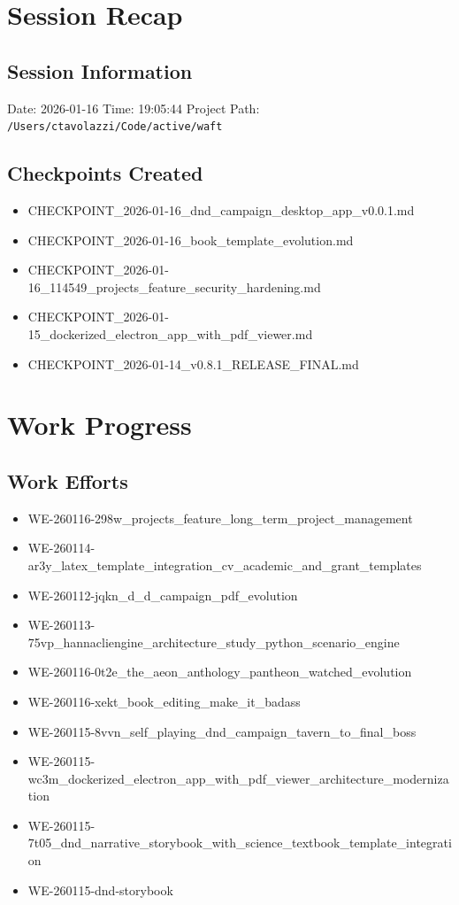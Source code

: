 \documentclass{book}
\begin{document}
\chapter{Session Recap}

\section{Session Information}
Date: 2026-01-16
Time: 19:05:44
Project Path: \texttt{/Users/ctavolazzi/Code/active/waft}

\section{Checkpoints Created}
\begin{itemize}
\item CHECKPOINT\_2026-01-16\_dnd\_campaign\_desktop\_app\_v0.0.1.md
\item CHECKPOINT\_2026-01-16\_book\_template\_evolution.md
\item CHECKPOINT\_2026-01-16\_114549\_projects\_feature\_security\_hardening.md
\item CHECKPOINT\_2026-01-15\_dockerized\_electron\_app\_with\_pdf\_viewer.md
\item CHECKPOINT\_2026-01-14\_v0.8.1\_RELEASE\_FINAL.md
\end{itemize}

\chapter{Work Progress}

\section{Work Efforts}
\begin{itemize}
\item WE-260116-298w\_projects\_feature\_long\_term\_project\_management
\item WE-260114-ar3y\_latex\_template\_integration\_cv\_academic\_and\_grant\_templates
\item WE-260112-jqkn\_d\_d\_campaign\_pdf\_evolution
\item WE-260113-75vp\_hannacliengine\_architecture\_study\_python\_scenario\_engine
\item WE-260116-0t2e\_the\_aeon\_anthology\_pantheon\_watched\_evolution
\item WE-260116-xekt\_book\_editing\_make\_it\_badass
\item WE-260115-8vvn\_self\_playing\_dnd\_campaign\_tavern\_to\_final\_boss
\item WE-260115-wc3m\_dockerized\_electron\_app\_with\_pdf\_viewer\_architecture\_modernization
\item WE-260115-7t05\_dnd\_narrative\_storybook\_with\_science\_textbook\_template\_integration
\item WE-260115-dnd-storybook
\end{itemize}
\end{document}
